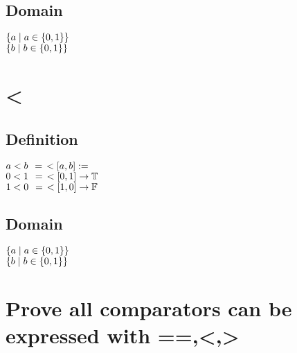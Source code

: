\documentclass[11pt]{article}
\begin{document}
\subsection{Domain}
\begin{center}
$
\{ a \hspace{1mm}| \hspace{1mm} a \in \{0,1\} \}
$
\\ \vspace{2mm}
$
\{ b \hspace{1mm}| \hspace{1mm} b \in \{0,1\} \}
$
\end{center}




\newpage
\section{<}
\subsection{Definition}
\begin{center}
$
a < b \hspace{1.5mm} =\hspace{1.5mm} <[a,b] :=
$
\\ \vspace{2mm}
$
0 < 1\hspace{1.5mm} =\hspace{1.5mm} <[0,1] \rightarrow \mathbb{T} 
$
\\ \vspace{2mm}
$
1 < 0 \hspace{1.5mm}=\hspace{1.5mm} <[1,0] \rightarrow \mathbb{F} 
$
\end{center}
\subsection{Domain}
\begin{center}
$
\{ a \hspace{1mm}| \hspace{1mm} a \in \{0,1\} \}
$
\\ \vspace{2mm}
$
\{ b \hspace{1mm}| \hspace{1mm} b \in \{0,1\} \}
$
\end{center}



\section{Prove all comparators can be expressed with ==,<,>}
\end{document}
